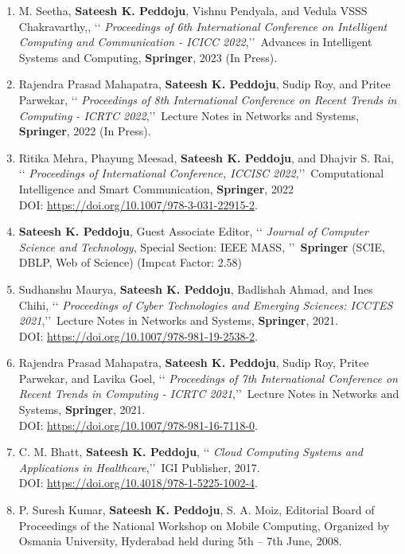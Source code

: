 \begin{enumerate}%

	\item%
M. Seetha, \textbf{Sateesh K. Peddoju}, Vishnu Pendyala, and Vedula VSSS Chakravarthy,, \lq\lq
\emph{Proceedings of 6th International Conference on Intelligent Computing and Communication - ICICC 2022},\rq\rq\, Advances in Intelligent Systems and Computing, \textbf{Springer}, 2023 (In Press).

	\item%
Rajendra Prasad Mahapatra, \textbf{Sateesh K. Peddoju}, Sudip Roy, and Pritee Parwekar, \lq\lq
\emph{Proceedings of 8th International Conference on Recent Trends in Computing - ICRTC 2022},\rq\rq\, Lecture Notes in Networks and Systems, \textbf{Springer}, 2022 (In Press).

	\item%
Ritika Mehra, Phayung Meesad, \textbf{Sateesh K. Peddoju}, and Dhajvir S. Rai, \lq\lq
\emph{Proceedings of International Conference, ICCISC 2022},\rq\rq\, Computational Intelligence and Smart Communication, \textbf{Springer}, 2022 \\DOI: \url{https://doi.org/10.1007/978-3-031-22915-2}.
		
		\item%
\textbf{Sateesh K. Peddoju}, Guest Associate Editor, \lq\lq
\emph{Journal of Computer Science and Technology}, Special Section: IEEE MASS, \rq\rq\, \textbf{Springer} (SCIE, DBLP, Web of Science) (Impcat Factor: 2.58)

	\item%
Sudhanshu Maurya, \textbf{Sateesh K. Peddoju}, 
 Badlishah Ahmad, and Ines Chihi, \lq\lq
\emph{Proceedings of Cyber Technologies and Emerging Sciences: ICCTES 2021},\rq\rq\, Lecture Notes in Networks and Systems, \textbf{Springer}, 2021. \\DOI: \url{https://doi.org/10.1007/978-981-19-2538-2}.

	\item%
Rajendra Prasad Mahapatra, \textbf{Sateesh K. Peddoju}, Sudip Roy, Pritee Parwekar, and Lavika Goel, \lq\lq
\emph{Proceedings of 7th International Conference on Recent Trends in Computing - ICRTC 2021},\rq\rq\, Lecture Notes in Networks and Systems, \textbf{Springer}, 2021. \\DOI: \url{https://doi.org/10.1007/978-981-16-7118-0}.
	
	\item%
C. M. Bhatt, \textbf{Sateesh K. Peddoju}, \lq\lq
\emph{Cloud Computing Systems and Applications in Healthcare},\rq\rq\, IGI Publisher, 2017. \\DOI: \url{https://doi.org/10.4018/978-1-5225-1002-4}.

\item%
P. Suresh Kumar, \textbf{Sateesh K. Peddoju}, S. A. Moiz, Editorial Board of Proceedings of the National Workshop on Mobile Computing, Organized by Osmania University, Hyderabad held during 5th – 7th June, 2008.

\end{enumerate}
